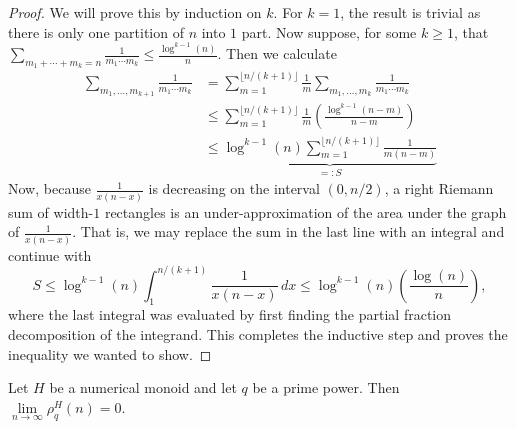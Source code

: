 \begin{proof}
	We will prove this by induction on $k$.
	For $k=1$, the result is trivial as there is only one partition of $n$ into $1$ part.
	Now suppose, for some $k\ge 1$, that $\sum_{m_1+\cdots+m_k=n} \frac{1}{m_1\cdots m_k} \le \frac{\log^{k-1}(n)}{n}$.
	Then we calculate
	\begin{align*}
	\sum_{m_1,\dots,m_{k+1}} \frac{1}{m_1\cdots m_k} 
	&= \sum_{m=1}^{\lfloor n/(k+1) \rfloor} \frac{1}{m} \sum_{m_1,\dots,m_k} \frac{1}{m_1\cdots m_k} \tag{inner sum taken over partitions of $n-m$}\\
	&\le \sum_{m=1}^{\lfloor n/(k+1)\rfloor} \frac{1}{m} \left( \frac{\log^{k-1}(n-m)}{n-m} \right) \\
	&\le \underbrace{\log^{k-1}(n) \sum_{m=1}^{\lfloor n/(k+1)\rfloor} \frac{1}{m(n-m)}}_{=:S}
	\end{align*}
	Now, because $\frac{1}{x(n-x)}$ is decreasing on the interval $(0,n/2)$, a right Riemann sum of width-$1$ rectangles is an under-approximation of the area under the graph of $\frac{1}{x(n-x)}$.
	That is, we may replace the sum in the last line with an integral and continue with
	\[
	S \le \log^{k-1}(n) \int_1^{n/(k+1)} \frac{1}{x(n-x)} \, dx 
	\le \log^{k-1}(n) \left(\frac{\log(n)}{n}\right),
	\]
	where the last integral was evaluated by first finding the partial fraction decomposition of the integrand.
	This completes the inductive step and proves the inequality we wanted to show.
\end{proof}

\begin{thm}
Let $H$ be a numerical monoid and let $q$ be a prime power.
Then $\lim\limits_{n\to\infty} \rho_q^H(n) = 0$.
\end{thm}


